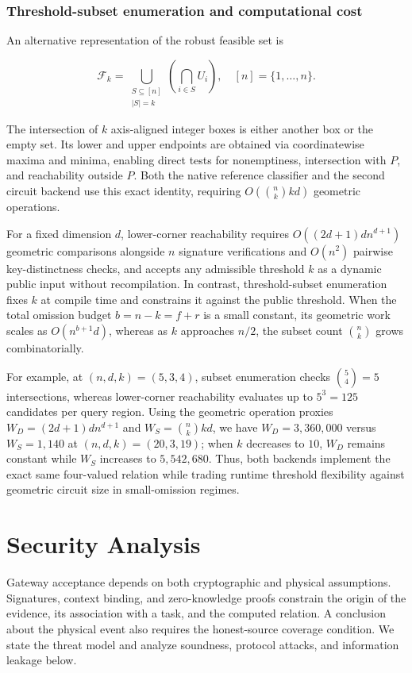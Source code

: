 \documentclass[pdflatex,iicol,sn-mathphys-num]{sn-jnl}
\theoremstyle{thmstyleone}
\begin{document}
\subsubsection{Threshold-subset enumeration and computational cost}
An alternative representation of the robust feasible set is

\begin{equation}\label{eq:subset}
\mathcal{F}_k = \bigcup_{\substack{S \subseteq [n] \\ |S| = k}} \left( \bigcap_{i \in S} U_i \right), \quad [n] = \{1, \dots, n\}.
\end{equation}


The intersection of $k$ axis-aligned integer boxes is either another box or the empty set. Its lower and upper endpoints are obtained via coordinatewise maxima and minima, enabling direct tests for nonemptiness, intersection with $P$, and reachability outside $P$. Both the native reference classifier and the second circuit backend use this exact identity, requiring $O(\binom{n}{k}kd)$ geometric operations.

For a fixed dimension $d$, lower-corner reachability requires $O((2d + 1)dn^{d+1})$ geometric comparisons alongside $n$ signature verifications and $O(n^2)$ pairwise key-distinctness checks, and accepts any admissible threshold $k$ as a dynamic public input without recompilation. In contrast, threshold-subset enumeration fixes $k$ at compile time and constrains it against the public threshold. When the total omission budget $b = n - k = f + r$ is a small constant, its geometric work scales as $O(n^{b+1}d)$, whereas as $k$ approaches $n/2$, the subset count $\binom{n}{k}$ grows combinatorially.

For example, at $(n, d, k) = (5, 3, 4)$, subset enumeration checks $\binom{5}{4} = 5$ intersections, whereas lower-corner reachability evaluates up to $5^3 = 125$ candidates per query region. Using the geometric operation proxies $W_D = (2d + 1)dn^{d+1}$ and $W_S = \binom{n}{k}kd$, we have $W_D = 3,360,000$ versus $W_S = 1,140$ at $(n, d, k) = (20, 3, 19)$; when $k$ decreases to $10$, $W_D$ remains constant while $W_S$ increases to $5,542,680$. Thus, both backends implement the exact same four-valued relation while trading runtime threshold flexibility against geometric circuit size in small-omission regimes.

\section{Security Analysis}\label{sec:security}
Gateway acceptance depends on both cryptographic and physical assumptions. Signatures, context binding, and zero-knowledge proofs constrain the origin of the evidence, its association with a task, and the computed relation. A conclusion about the physical event also requires the honest-source coverage condition. We state the threat model and analyze soundness, protocol attacks, and information leakage below.
\end{document}
